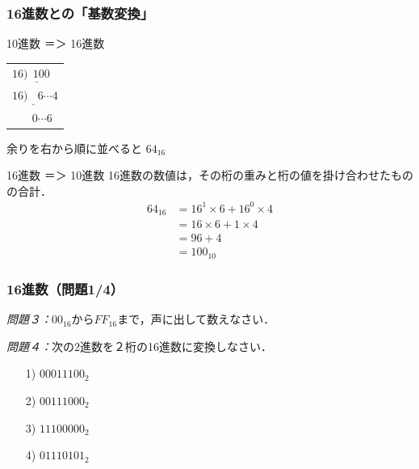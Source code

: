 \documentclass[handout]{beamer}        %
\begin{document}
\begin{frame}
  \frametitle{16進数との「基数変換」}

  \begin{itembox}[l]{10進数 ＝＞ 16進数}
    \begin{minipage}{0.3\columnwidth}
      \begin{flushright}
        \begin{tabular}{l}
          $16 \underline{) ~~100 } $\\
          $16 \underline{) ~~~~6 } {\cdots 4}$ \\
          $~~~            ~~~~~0   {\cdots 6}$
        \end{tabular}
      \end{flushright}
    \end{minipage}
    \begin{minipage}{0.5\columnwidth}
      余りを右から順に並べると $64_{16}$
    \end{minipage}
  \end{itembox}

  \begin{itembox}[l]{16進数 ＝＞ 10進数}
    16進数の数値は，その桁の重みと桁の値を掛け合わせたものの合計．
    \begin{align*}
      64_{16} &= 16^1 \times 6 + 16^0 \times 4 \\
      &= 16 \times 6 + 1 \times 4 \\
      &= 96 + 4 \\
      &= 100_{10}
    \end{align*}
  \end{itembox}
\end{frame}

\begin{frame}
  \frametitle{16進数（問題1/4）}
\emph{問題３：}$00_{16}$から$FF_{16}$まで，声に出して数えなさい．


\emph{問題４：}次の2進数を２桁の16進数に変換しなさい．
\begin{enumerate}
\item[1)] $0001 1100_2$
\vfill
\item[2)] $0011 1000_2$
\vfill
\item[3)] $1110 0000_2$
\vfill
\item[4)] $0111 0101_2$
\vfill
\end{enumerate}
\vfill
\end{frame}
\end{document}
